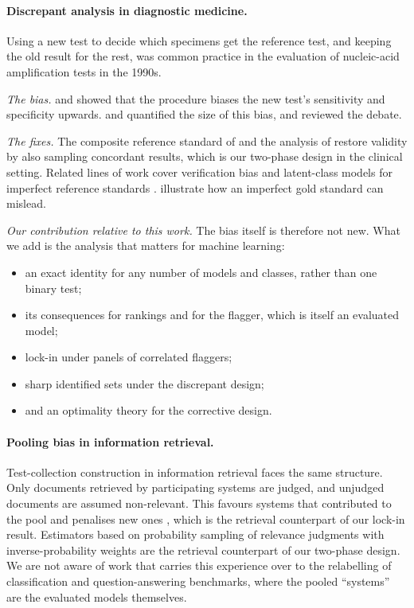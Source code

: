 \paragraph{Discrepant analysis in diagnostic medicine.} Using a new test to decide which specimens get the reference test, and keeping the old result for the rest, was common practice in the evaluation of nucleic-acid amplification tests in the 1990s.

\emph{The bias.} \citet{hadgu1996discrepancy,hadgu1997bias,hadgu1999discrepant} and \citet{miller1998bias} showed that the procedure biases the new test's sensitivity and specificity upwards. \citet{green1998evaluation} and \citet{lipman1998quantifying} quantified the size of this bias, and \citet{hadgu2000discrepant} reviewed the debate.

\emph{The fixes.} The composite reference standard of \citet{alonzo1999using} and the analysis of \citet{hawkins2001some} restore validity by also sampling concordant results, which is our two-phase design in the clinical setting. Related lines of work cover verification bias \citep{begg1983assessment} and latent-class models for imperfect reference standards \citep{hui1980estimating,walter1988estimation,reitsma2009review}. \citet{limmathurotsakul2012fools} illustrate how an imperfect gold standard can mislead.

\emph{Our contribution relative to this work.} The bias itself is therefore not new. What we add is the analysis that matters for machine learning:
\begin{itemize}
\item an exact identity for any number of models and classes, rather than one binary test;
\item its consequences for rankings and for the flagger, which is itself an evaluated model;
\item lock-in under panels of correlated flaggers;
\item sharp identified sets under the discrepant design;
\item and an optimality theory for the corrective design.
\end{itemize}

\paragraph{Pooling bias in information retrieval.} Test-collection construction in information retrieval faces the same structure. Only documents retrieved by participating systems are judged, and unjudged documents are assumed non-relevant. This favours systems that contributed to the pool and penalises new ones \citep{zobel1998how,buckley2007bias}, which is the retrieval counterpart of our lock-in result. Estimators based on probability sampling of relevance judgments with inverse-probability weights \citep{aslam2006statistical,yilmaz2006estimating} are the retrieval counterpart of our two-phase design. We are not aware of work that carries this experience over to the relabelling of classification and question-answering benchmarks, where the pooled ``systems'' are the evaluated models themselves.

